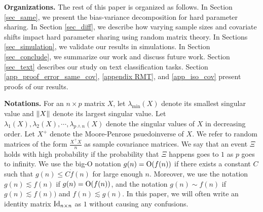 \documentclass[aos,preprint]{imsart}
\begin{document}



\smallskip
\noindent\textbf{Organizations.}
The rest of this paper is organized as follows.
In Section \ref{sec_same}, we present the bias-variance decomposition for hard parameter sharing.
In Section \ref{sec_diff}, we describe how varying sample sizes and covariate shifts impact hard parameter sharing using random matrix theory.
In Sections \ref{sec_simulation}, we validate our results in simulations.
In Section \ref{sec_conclude}, we summarize our work and discuss future work.
Section \ref{sec_text} describes our study on text classification tasks.
Section \ref{app_proof_error_same_cov}, \ref{appendix RMT}, and \ref{app_iso_cov} present proofs of our results.

\medskip
\noindent\textbf{Notations.}
For an $n\times p$ matrix $X$, let $\lambda_{\min}(X)$ denote its smallest singular value and $\|X\|$ denote its largest singular value.
Let $\lambda_1(X), \lambda_2(X), \cdots, \lambda_{p\wedge n}(X)$ denote the singular values of $X$ in decreasing order.
Let $X^+$ denote the Moore-Penrose psuedoinverse of $X$.
We refer to random matrices of the form $\frac {X^\top X} n$ as sample covariance matrices.
We say that an event $\Xi$ holds with high probability if the probability that $\Xi$ happens goes to $1$ as $p$ goes to infinity.
We use the big-O notation $g(n) = \operatorname{O}(f(n))$ if there exists a constant $C$ such that $g(n) \le C \dot f(n)$ for large enough $n$. Moreover, we use the notation $g(n)\lesssim f(n)$ if $g(n) = \operatorname{O}(f(n))$, and the notation $g(n)\sim f(n)$ if $g(n) \lesssim f(n))$ and $f(n) \lesssim g(n)$. In this paper, we will often write an identity matrix $\operatorname{Id}_{n\times n}$ as $1$ without causing any confusions. 
\end{document}
